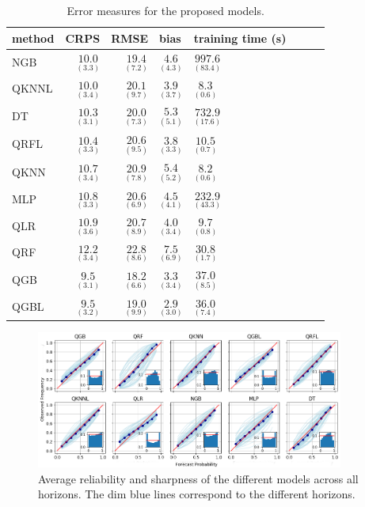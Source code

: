 \documentclass[a4paper,3p,sort&compress]{elsarticle}
\begin{document}
\begin{table}[tbp]
  \centering \footnotesize
  \caption{\label{tab:determ}Error measures for the proposed models.}
    \begin{tabular}{lrrlllll}
      \toprule
         method &              CRPS &              RMSE &             bias &                training time (s) \\
        \midrule
            NGB &  $ \underset{(3.3)}{10.0} $ &  $ \underset{(7.2)}{19.4} $ &  $ \underset{(4.3)} {4.6}$ & $ \underset{(83.4)}  {997.6}$    \\
          QKNNL &  $ \underset{(3.4)}{10.0} $ &  $ \underset{(9.7)}{20.1} $ &  $ \underset{(3.7)} {3.9}$ & $ \underset{(0.6)}     {8.3}$    \\
             DT &  $ \underset{(3.1)}{10.3} $ &  $ \underset{(7.3)}{20.0} $ &  $ \underset{(5.1)} {5.3}$ & $ \underset{(17.6)}  {732.9}$   \\
           QRFL &  $ \underset{(3.3)}{10.4} $ &  $ \underset{(9.5)}{20.6} $ &  $ \underset{(3.3)} {3.8}$ & $ \underset{(0.7)}    {10.5}$    \\
           QKNN &  $ \underset{(3.4)}{10.7} $ &  $ \underset{(7.8)}{20.9} $ &  $ \underset{(5.2)} {5.4}$ & $ \underset{(0.6)}     {8.2}$   \\
            MLP &  $ \underset{(3.3)}{10.8} $ &  $ \underset{(6.9)}{20.6} $ &  $ \underset{(4.1)} {4.5}$ & $ \underset{(43.3)}  {232.9}$   \\
            QLR &  $ \underset{(3.6)}{10.9} $ &  $ \underset{(8.9)}{20.7} $ &  $ \underset{(3.4)} {4.0}$ & $ \underset{(0.8)}     {9.7}$    \\
            QRF &  $ \underset{(3.4)}{12.2} $ &  $ \underset{(8.6)}{22.8} $ &  $ \underset{(6.9)} {7.5}$ & $ \underset{(1.7)}    {30.8}$    \\
            QGB &  $ \underset{(3.1)}{9.5}  $ &  $ \underset{(6.6)}{18.2} $ &  $ \underset{(3.4)} {3.3}$ & $ \underset{(8.5)}    {37.0}$    \\
           QGBL &  $ \underset{(3.2)}{9.5}  $ &  $ \underset{(9.9)}{19.0} $ &  $ \underset{(3.0)} {2.9}$ & $ \underset{(7.4)}    {36.0}$   \\
       \bottomrule
      \end{tabular}
\end{table}

\begin{figure}
  \centering
  \includegraphics[width=0.9\textwidth]{reliability_sharpness}
  \caption{\label{figure:rel_sharp}Average reliability and sharpness
    of the different models across all horizons. The dim blue lines
    correspond to the different horizons. }
\end{figure}       
\end{document}
